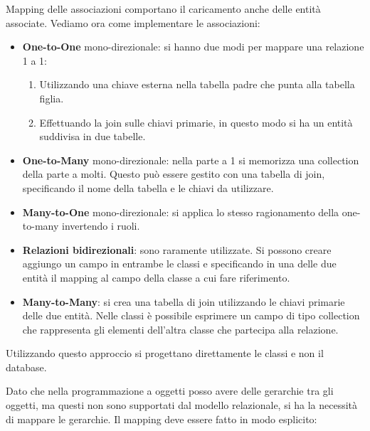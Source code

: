 Mapping delle associazioni comportano il caricamento anche delle entità associate.
Vediamo ora come implementare le associazioni:
\begin{itemize}
      \item \textbf{One-to-One} mono-direzionale: si hanno due modi per mappare
            una relazione 1 a 1:
            \begin{enumerate}
                  \item Utilizzando una chiave esterna nella tabella padre che punta
                        alla tabella figlia.
                  \item Effettuando la join sulle chiavi primarie, in questo modo
                        si ha un entità suddivisa in due tabelle.
            \end{enumerate}
      \item \textbf{One-to-Many} mono-direzionale: nella parte a 1 si memorizza
            una collection della parte a molti. Questo può essere gestito con una
            tabella di join, specificando il nome della tabella e le chiavi da
            utilizzare.
      \item \textbf{Many-to-One} mono-direzionale: si applica lo stesso ragionamento
            della one-to-many invertendo i ruoli.
      \item \textbf{Relazioni bidirezionali}: sono raramente utilizzate. Si possono
            creare aggiungo un campo in entrambe le classi e specificando in una
            delle due entità il mapping al campo della classe a cui fare riferimento.
      \item \textbf{Many-to-Many}: si crea una tabella di join utilizzando le
            chiavi primarie delle due entità. Nelle classi è possibile esprimere
            un campo di tipo collection che rappresenta gli elementi dell'altra
            classe che partecipa alla relazione.
\end{itemize}
\begin{nota}
      Utilizzando questo approccio si progettano direttamente le classi e non il
      database.
\end{nota}
Dato che nella programmazione a oggetti posso avere delle gerarchie tra gli
oggetti, ma questi non sono supportati dal modello relazionale, si ha la necessità
di mappare le gerarchie. Il mapping deve essere fatto in modo esplicito:
